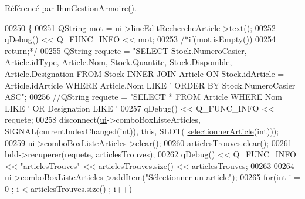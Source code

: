 Référencé par \hyperlink{class_ihm_gestion_armoire_a7aa5e1514dd5d1b5648a2f6dd36970f9}{Ihm\+Gestion\+Armoire()}.


\begin{DoxyCode}
00250 \{
00251     QString mot = \hyperlink{class_ihm_gestion_armoire_a793a2816dc21b3161566138d2af5a8b9}{ui}->lineEditRechercheArticle->text();
00252     qDebug() << Q\_FUNC\_INFO << mot;
00253     \textcolor{comment}{/*if(mot.isEmpty())}
00254 \textcolor{comment}{        return;*/}
00255     QString requete = \textcolor{stringliteral}{"SELECT Stock.NumeroCasier, Article.idType, Article.Nom, Stock.Quantite,
       Stock.Disponible, Article.Designation FROM Stock INNER JOIN Article ON Stock.idArticle = Article.idArticle WHERE
       Article.Nom LIKE '%
       ORDER BY Stock.NumeroCasier ASC"};
00256     \textcolor{comment}{//QString requete = "SELECT * FROM Article WHERE Nom LIKE '%
       OR Designation LIKE '%
00257     qDebug() << Q\_FUNC\_INFO << requete;
00258     disconnect(\hyperlink{class_ihm_gestion_armoire_a793a2816dc21b3161566138d2af5a8b9}{ui}->comboBoxListeArticles, SIGNAL(currentIndexChanged(\textcolor{keywordtype}{int})), \textcolor{keyword}{this}, SLOT(
      \hyperlink{class_ihm_gestion_armoire_a28970b692994ad7201c03decd42ec0e5}{selectionnerArticle}(\textcolor{keywordtype}{int})));
00259     \hyperlink{class_ihm_gestion_armoire_a793a2816dc21b3161566138d2af5a8b9}{ui}->comboBoxListeArticles->clear();
00260     \hyperlink{class_ihm_gestion_armoire_a21821dc4f15d87125efb933991eb4385}{articlesTrouves}.clear();
00261     \hyperlink{class_ihm_gestion_armoire_ad0d3a89bbcfa9f0e50ff5c50ec64d707}{bdd}->\hyperlink{class_base_de_donnees_a77539baad389f5acf754cd2cd452403e}{recuperer}(requete, \hyperlink{class_ihm_gestion_armoire_a21821dc4f15d87125efb933991eb4385}{articlesTrouves});
00262     qDebug() << Q\_FUNC\_INFO << \textcolor{stringliteral}{"articlesTrouves"} << \hyperlink{class_ihm_gestion_armoire_a21821dc4f15d87125efb933991eb4385}{articlesTrouves}.size() << 
      \hyperlink{class_ihm_gestion_armoire_a21821dc4f15d87125efb933991eb4385}{articlesTrouves};
00263 
00264     \hyperlink{class_ihm_gestion_armoire_a793a2816dc21b3161566138d2af5a8b9}{ui}->comboBoxListeArticles->addItem(\textcolor{stringliteral}{"Sélectionner un article"});
00265     \textcolor{keywordflow}{for}(\textcolor{keywordtype}{int} i = 0 ; i < \hyperlink{class_ihm_gestion_armoire_a21821dc4f15d87125efb933991eb4385}{articlesTrouves}.size() ; i++)
}
\end{DoxyCode}
